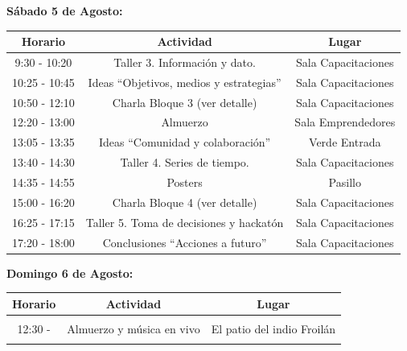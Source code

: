 \documentclass[a4paper,11pt]{book}
\theoremstyle{definition}
\begin{document}
\begin{table}[ht!]
\textbf{Sábado 5 de Agosto:}  \\[-0.2cm]

\small \centering
\begin{tabular}{ccc}

\hline
\rowcolor{gray!20} \textbf{Horario} &  \hspace{2.1cm} \textbf{Actividad} \hspace{2.1cm}  &  \phantom{.}\hspace{2.1cm} \textbf{Lugar} \hspace{2.1cm} \\
\hline \hline
9:30 - 10:20 & Taller 3. Información y dato. & Sala Capacitaciones \\
\hline
\rowcolor{gray!10}
10:25 - 10:45 & Ideas ``Objetivos, medios y estrategias'' & Sala Capacitaciones \\
\hline
10:50 - 12:10 & Charla Bloque 3 (ver detalle) & Sala Capacitaciones \\
\hline
\hline
\rowcolor{gray!10}
 12:20 - 13:00 & Almuerzo & Sala Emprendedores \\
\rowcolor{gray!10}
 13:05 - 13:35 & Ideas ``Comunidad y colaboración'' & Verde Entrada \\
\hline
\hline
13:40 - 14:30 & Taller 4. Series de tiempo. & Sala Capacitaciones \\
\hline
\rowcolor{gray!10}
14:35 - 14:55 & Posters & Pasillo \\
\hline
15:00 - 16:20 & Charla Bloque 4 (ver detalle) & Sala Capacitaciones \\
\hline
\rowcolor{gray!10}
16:25 - 17:15 & Taller 5. Toma de decisiones y hackatón & Sala Capacitaciones \\
\hline
17:20 - 18:00 & Conclusiones ``Acciones a futuro'' & Sala Capacitaciones \\
\hline
\end{tabular}
\end{table}

\begin{table}[ht!]
\textbf{Domingo 6 de Agosto:}  \\[-0.2cm]

\centering \small
\begin{tabular}{ccc}
\hline
\rowcolor{gray!20} \textbf{Horario} &  \hspace{2.1cm} \textbf{Actividad} \hspace{2.1cm}  &  \phantom{.}\hspace{2.1cm} \textbf{Lugar} \hspace{2.1cm} \\
\hline \hline
& & \\
12:30 -  & Almuerzo y música en vivo & El patio del indio Froilán \\
  &  &  \\
\hline
\end{tabular}
\end{table}
\end{document}
